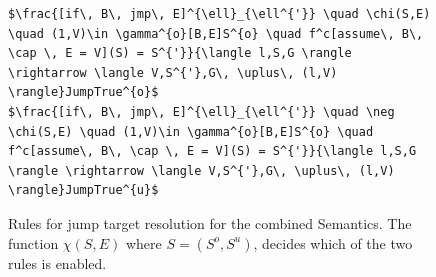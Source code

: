 \documentclass{kththesis}
\begin{document}
\begin{figure}[h]
    \centering
\begin{lstlisting}[style=abstractInt]
$\frac{[if\, B\, jmp\, E]^{\ell}_{\ell^{'}} \quad \chi(S,E) \quad (1,V)\in \gamma^{o}[B,E]S^{o} \quad f^c[assume\, B\, \cap \, E = V](S) = S^{'}}{\langle l,S,G \rangle \rightarrow \langle V,S^{'},G\, \uplus\, (l,V) \rangle}JumpTrue^{o}$
$\frac{[if\, B\, jmp\, E]^{\ell}_{\ell^{'}} \quad \neg \chi(S,E) \quad (1,V)\in \gamma^{o}[B,E]S^{o} \quad f^c[assume\, B\, \cap \, E = V](S) = S^{'}}{\langle l,S,G \rangle \rightarrow \langle V,S^{'},G\, \uplus\, (l,V) \rangle}JumpTrue^{u}$
\end{lstlisting}
\caption[Rules for jump target resolution for the combined Semantics.]{Rules for jump target resolution for the combined Semantics. The function $\chi(S,E)$ where $S=(S^o,S^u)$, decides which of the two rules is enabled.}
    \label{fig:combinedJumpTrue}
\end{figure}
\end{document}
